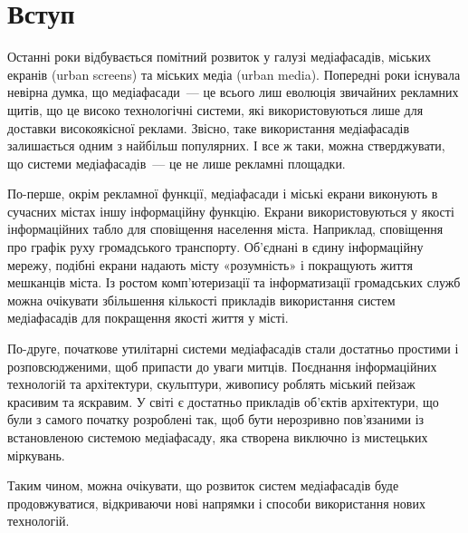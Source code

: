 \documentclass[a4paper,ukrainian,utf8,nocolumnsxix,floatsection,equationsection]{eskdtext}
\newcommand{\sectionnonum}[1]{\section*{#1}\addcontentsline{toc}{section}{#1}}
\begin{document}


{}






\tableofcontents


\sectionnonum{Вступ}
\label{sec:intro}

Останні роки відбувається помітний розвиток у галузі медіафасадів, міських екранів (urban screens) та міських медіа (urban media). Попередні роки існувала невірна думка, що медіафасади~--- це всього лиш еволюція звичайних рекламних щитів, що це високо технологічні системи, які використовуються лише для доставки високоякісної реклами. Звісно, таке використання медіафасадів залишається одним з найбільш популярних. І все ж таки, можна стверджувати, що системи медіафасадів~--- це не лише рекламні площадки. 

По-перше, окрім рекламної функції, медіафасади і міські екрани виконують в сучасних містах іншу інформаційну функцію. Екрани використовуються у якості інформаційних табло для сповіщення населення міста. Наприклад, сповіщення про графік руху громадського транспорту. Об'єднані в єдину інформаційну мережу, подібні екрани надають місту «розумність» і покращують життя мешканців міста. Із ростом комп'ютеризації та інформатизації громадських служб можна очікувати збільшення кількості прикладів використання систем медіафасадів для покращення якості життя у місті.

По-друге, початкове утилітарні системи медіафасадів стали достатньо простими і розповсюдженими, щоб припасти до уваги митців. Поєднання інформаційних технологій та архітектури, скульптури, живопису роблять міський пейзаж красивим та яскравим. У світі є достатньо прикладів об'єктів архітектури, що були з самого початку розроблені так, щоб бути нерозривно пов'язаними із встановленою системою медіафасаду, яка створена виключно із мистецьких міркувань. 

Таким чином, можна очікувати, що розвиток систем медіафасадів буде продовжуватися, відкриваючи нові напрямки і способи використання нових технологій.  
\end{document}

